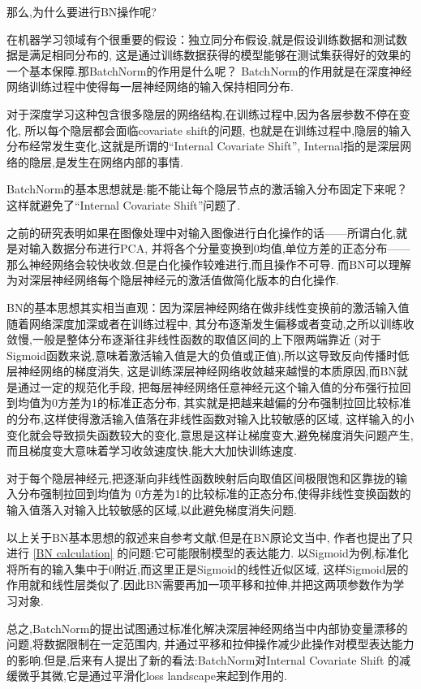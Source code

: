 那么,为什么要进行BN操作呢?

在机器学习领域有个很重要的假设：独立同分布假设,就是假设训练数据和测试数据是满足相同分布的,
这是通过训练数据获得的模型能够在测试集获得好的效果的一个基本保障.那BatchNorm的作用是什么呢？
BatchNorm的作用就是在深度神经网络训练过程中使得每一层神经网络的输入保持相同分布.

对于深度学习这种包含很多隐层的网络结构,在训练过程中,因为各层参数不停在变化,
所以每个隐层都会面临covariate shift的问题,
也就是在训练过程中,隐层的输入分布经常发生变化,这就是所谓的“Internal Covariate Shift”,
Internal指的是深层网络的隐层,是发生在网络内部的事情.

BatchNorm的基本思想就是:能不能让每个隐层节点的激活输入分布固定下来呢？
这样就避免了“Internal Covariate Shift”问题了.

之前的研究表明如果在图像处理中对输入图像进行白化操作的话——所谓白化,就是对输入数据分布进行PCA,
并将各个分量变换到0均值,单位方差的正态分布——那么神经网络会较快收敛.但是白化操作较难进行,而且操作不可导.
而BN可以理解为对深层神经网络每个隐层神经元的激活值做简化版本的白化操作.

BN的基本思想其实相当直观：因为深层神经网络在做非线性变换前的激活输入值随着网络深度加深或者在训练过程中,
其分布逐渐发生偏移或者变动,之所以训练收敛慢,一般是整体分布逐渐往非线性函数的取值区间的上下限两端靠近
(对于Sigmoid函数来说,意味着激活输入值是大的负值或正值),所以这导致反向传播时低层神经网络的梯度消失,
这是训练深层神经网络收敛越来越慢的本质原因,而BN就是通过一定的规范化手段,
把每层神经网络任意神经元这个输入值的分布强行拉回到均值为0方差为1的标准正态分布,
其实就是把越来越偏的分布强制拉回比较标准的分布,这样使得激活输入值落在非线性函数对输入比较敏感的区域,
这样输入的小变化就会导致损失函数较大的变化,意思是这样让梯度变大,避免梯度消失问题产生,
而且梯度变大意味着学习收敛速度快,能大大加快训练速度.

对于每个隐层神经元,把逐渐向非线性函数映射后向取值区间极限饱和区靠拢的输入分布强制拉回到均值为
0方差为1的比较标准的正态分布,使得非线性变换函数的输入值落入对输入比较敏感的区域,以此避免梯度消失问题.

以上关于BN基本思想的叙述来自参考文献\cite{BN}.但是在BN原论文\cite{BNpaper}当中,
作者也提出了只进行 \ref{BN calculation} 的问题:它可能限制模型的表达能力.
以Sigmoid为例,标准化将所有的输入集中于$0$附近,而这里正是Sigmoid的线性近似区域,
这样Sigmoid层的作用就和线性层类似了.因此BN需要再加一项平移和拉伸,并把这两项参数作为学习对象.

总之,BatchNorm的提出试图通过标准化解决深层神经网络当中内部协变量漂移的问题,将数据限制在一定范围内,
并通过平移和拉伸操作减少此操作对模型表达能力的影响.但是,后来有人提出了新的看法:BatchNorm对Internal Covariate Shift
的减缓微乎其微,它是通过平滑化loss landscape来起到作用的.


